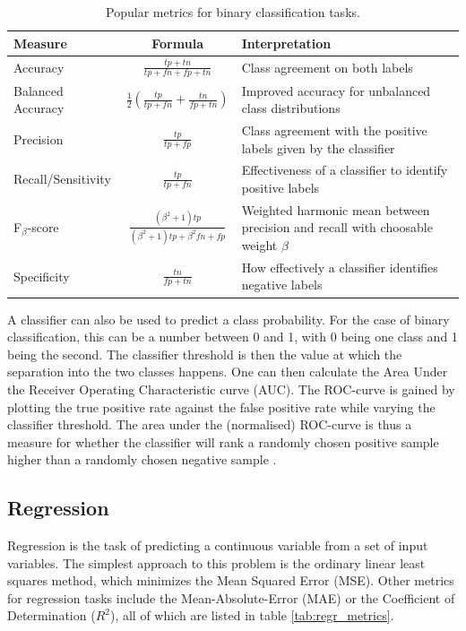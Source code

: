\begin{table}
    \caption{Popular metrics for binary classification tasks.}
    \begin{center}
        \begin{tabularx}{\textwidth}{l c X}
            Measure & Formula & Interpretation \\
            \hline
            Accuracy & $\frac{tp+tn}{tp+fn+fp+tn}$ & Class agreement on both labels \\
            Balanced Accuracy & $\frac{1}{2}(\frac{tp}{tp+fn}+\frac{tn}{fp+tn})$ & Improved accuracy for unbalanced class distributions \\
            Precision & $\frac{tp}{tp+fp}$ & Class agreement with the positive labels given by the classifier \\
            Recall/Sensitivity & $\frac{tp}{tp+fn}$ & Effectiveness of a classifier to identify positive labels \\
            F$_{\beta}$-score & $\frac{(\beta^2+1)tp}{(\beta^2+1)tp+\beta^2fn+fp}$ & Weighted harmonic mean between precision and recall with choosable weight $\beta$ \\
            Specificity & $\frac{tn}{fp+tn}$ & How effectively a classifier identifies negative labels \\
        \end{tabularx}
    \end{center}
    \label{tab:class_metrics}
\end{table}

A classifier can also be used to predict a class probability.
For the case of binary classification, this can be a number between 0 and 1,
with 0 being one class and 1 being the second.
The classifier threshold is then the value at which the separation into the two classes happens.
One can then calculate the Area Under the Receiver Operating Characteristic curve (AUC).
The ROC-curve is gained by plotting the true positive rate against the false positive rate while varying the classifier threshold.
The area under the (normalised) ROC-curve is thus a measure for whether the classifier will
rank a randomly chosen positive sample higher than a randomly chosen negative sample \cite{FAWCETT2006861}.


\subsection{Regression}
Regression is the task of predicting a continuous variable
from a set of input variables.
The simplest approach
to this problem is the ordinary linear least squares method,
which minimizes the Mean Squared Error (MSE).
Other metrics for regression tasks include the
Mean-Absolute-Error (MAE)
or the Coefficient of Determination ($R^2$), all of which are listed in table
\ref{tab:regr_metrics}.

